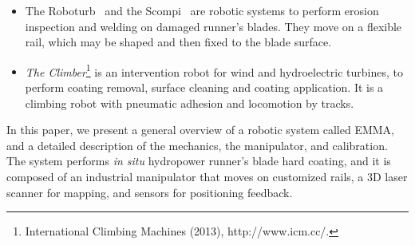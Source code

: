 \begin{itemize}
\item The Roboturb~\cite{roboturb} and the Scompi~\cite{scompi} are robotic
systems to perform erosion inspection and welding on damaged runner's blades.
They move on a flexible rail, which may be shaped and then fixed to the blade
surface.

\item \textit{The Climber}\footnote{International Climbing Machines (2013),
http://www.icm.cc/.} %
 is an intervention robot for wind and hydroelectric turbines, to perform
coating removal, surface cleaning and coating application. It is a climbing
robot with pneumatic adhesion and locomotion by tracks.
\end{itemize}

In this paper, we present a general overview of a robotic system called EMMA,
and a detailed description of the mechanics, the manipulator, and
calibration. The system performs \textit{in situ} hydropower
runner's blade hard coating, and it is composed of an industrial manipulator
that moves on customized rails, a 3D laser scanner for mapping, and
sensors for positioning feedback.
\begin{comment}
The system operate in a confined space, move
on a sloping and slippery environment through a rail, identify the runner's
blades, calibrate its position, generate the path planning and perform the hard
coating. 


This text is organized as follows: a general overview of the robot and its main
challenges are presented in Section \ref{sec:general_overview}, detailed
descriptions of the embedded electronics, the vehicle support system, power
supply system, and software architecture are taken in
Sections \ref{sec:electronics_overview}, \ref{sec:powersupply_overview}, and
\ref{sec:software} respectively.
In Section \ref{sec:results}, preliminary results are shown, and concluding
remarks are drawn in Section \ref{sec:conclusions}.
\end{comment}